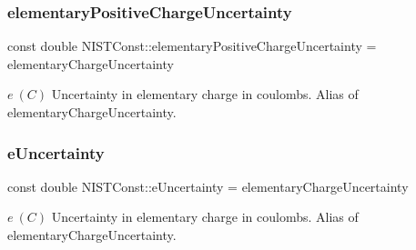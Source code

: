 \subsubsection{\texorpdfstring{elementary\+Positive\+Charge\+Uncertainty}{elementaryPositiveChargeUncertainty}}
{\footnotesize\ttfamily const double N\+I\+S\+T\+Const\+::elementary\+Positive\+Charge\+Uncertainty = elementary\+Charge\+Uncertainty}

$e \ (C)$ Uncertainty in elementary charge in coulombs. Alias of elementary\+Charge\+Uncertainty. \mbox{\label{group___n_i_s_t_const-_elementary_charge_ga2c92e71a42a5f0e7facd87c2c15c0f2b}} 
\subsubsection{\texorpdfstring{e\+Uncertainty}{eUncertainty}}
{\footnotesize\ttfamily const double N\+I\+S\+T\+Const\+::e\+Uncertainty = elementary\+Charge\+Uncertainty}

$e \ (C)$ Uncertainty in elementary charge in coulombs. Alias of elementary\+Charge\+Uncertainty. 
